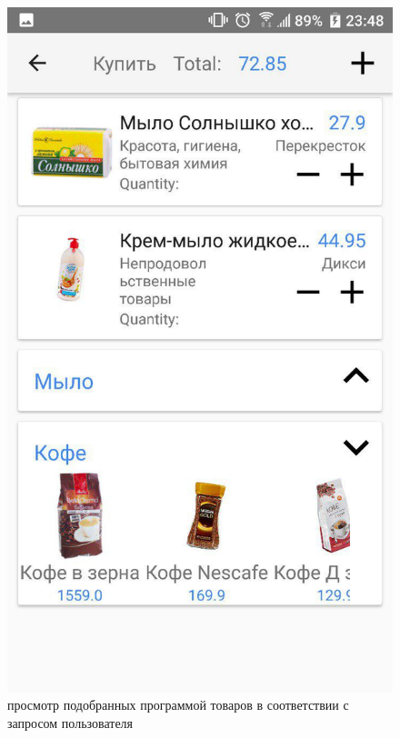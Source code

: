 \begin{figure}[h!]
    \includegraphics[height=0.38\textheight]{./screenshots/3/shoplist_custom_fold.jpg}
    \caption{\small{просмотр подобранных программой товаров в соответствии с запросом пользователя}}
    \endminipage\hfill

\end{figure}

